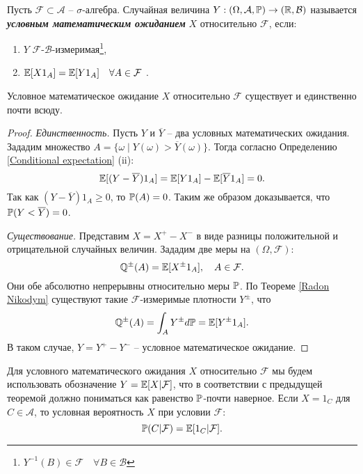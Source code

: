 \begin{defn}\label{Conditional expectation}
	Пусть $\mathcal{F} \subset \mathcal{A}$ -- $\sigma$-алгебра. Случайная величина $Y: (\Omega, \mathcal{A}, \mathbb{P}) \rightarrow (\mathbb{R}, \mathcal{B})$ называется \textbf{\textit{условным математическим ожиданием}} $X$ относительно $\mathcal{F}$, если:
	\begin{enumerate}
		\item $Y$ $\mathcal{F}$-$\mathcal{B}$-измеримая\footnote{$Y^{-1}(B) \in \mathcal{F} \quad \forall B \in \mathcal{B}$},
		\item $\mathbb{E}[X 1_{A}]=\mathbb{E}[Y 1_{A}] \quad \forall A \in \mathcal{F}$ .
	\end{enumerate}
\end{defn}

\begin{thm}\label{Existence and uniqueness of expectation}
	Условное математическое ожидание $X$ относительно $\mathcal{F}$ существует и единственно почти всюду.
\end{thm}

\begin{proof}
	\textit{Единственность.} Пусть $Y$ и $\overline{Y}$ -- два условных математических ожидания. Зададим множество $A=\{\omega \mid Y(\omega) > \overline{Y}({\omega}) \}$. Тогда согласно Определению \ref{Conditional expectation} (ii):
	\[\mathbb{E}[(Y-\overline{Y})1_A]=\mathbb{E}[Y1_A]-\mathbb{E}[\overline{Y}1_A]=0.   \]
	Так как $(Y-\overline{Y})1_A \geq 0$, то $\mathbb{P}(A)=0$. Таким же образом доказывается, что $\mathbb{P}(Y<\overline{Y})=0$.
	
	\textit{Существование.} Представим $X=X^+-X^-$ в виде разницы положительной и отрицательной случайных величин. Зададим две меры на $(\Omega, \mathcal{F})$:
	\[\mathbb{Q}^{\pm}(A)=\mathbb{E}[X^\pm 1_A],  \quad A \in \mathcal{F}.\]
	Они обе абсолютно непрерывны относительно меры $\mathbb{P}$. По Теореме \ref{Radon Nikodym} существуют такие $\mathcal{F}$-измеримые плотности $Y^\pm$, что
	\[\mathbb{Q}^{\pm}(A)=\int_A Y^\pm d\mathbb{P} = \mathbb{E}[Y^\pm 1_A].\]
	В таком случае, $Y = Y^+-Y^-$ -- условное математическое ожидание.	
\end{proof}

\begin{rmrk}
	Для условного математического ожидания $X$ относительно $\mathcal{F}$ мы будем использовать обозначение $Y=\mathbb{E}[X | \mathcal{F}]$, что в соответствии с предыдущей теоремой должно пониматься как равенство $\mathbb{P}$-почти наверное. Если $X=1_C$ для $C \in \mathcal{A}$, то условная вероятность $X$ при условии $\mathcal{F}$:
	\[\mathbb{P}(C|\mathcal{F})=\mathbb{E}[1_C|\mathcal{F}].\]
\end{rmrk}

